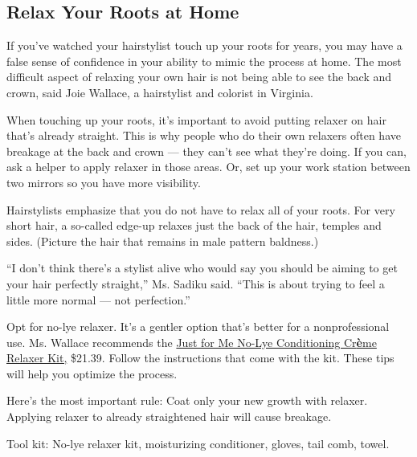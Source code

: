 \hypertarget{relax-your-roots-at-home}{%
\subsection{Relax Your Roots at Home}\label{relax-your-roots-at-home}}

If you've watched your hairstylist touch up your roots for years, you
may have a false sense of confidence in your ability to mimic the
process at home. The most difficult aspect of relaxing your own hair is
not being able to see the back and crown, said Joie Wallace, a
hairstylist and colorist in Virginia.

When touching up your roots, it's important to avoid putting relaxer on
hair that's already straight. This is why people who do their own
relaxers often have breakage at the back and crown --- they can't see
what they're doing. If you can, ask a helper to apply relaxer in those
areas. Or, set up your work station between two mirrors so you have more
visibility.

Hairstylists emphasize that you do not have to relax all of your roots.
For very short hair, a so-called edge-up relaxes just the back of the
hair, temples and sides. (Picture the hair that remains in male pattern
baldness.)

``I don't think there's a stylist alive who would say you should be
aiming to get your hair perfectly straight,'' Ms. Sadiku said. ``This is
about trying to feel a little more normal --- not perfection.''

Opt for no-lye relaxer. It's a gentler option that's better for a
nonprofessional use. Ms. Wallace recommends the
\href{https://www.amazon.com/conditioning-relaxer-childrens-regular-application/dp/B005IUGXY4}{Just
for Me No-Lye Conditioning
Cr}\textbf{\href{https://www.amazon.com/conditioning-relaxer-childrens-regular-application/dp/B005IUGXY4}{è}}\href{https://www.amazon.com/conditioning-relaxer-childrens-regular-application/dp/B005IUGXY4}{me
Relaxer Kit,} \$21.39. Follow the instructions that come with the kit.
These tips will help you optimize the process.

Here's the most important rule: Coat only your new growth with relaxer.
Applying relaxer to already straightened hair will cause breakage.

Tool kit: No-lye relaxer kit, moisturizing conditioner, gloves, tail
comb, towel.

